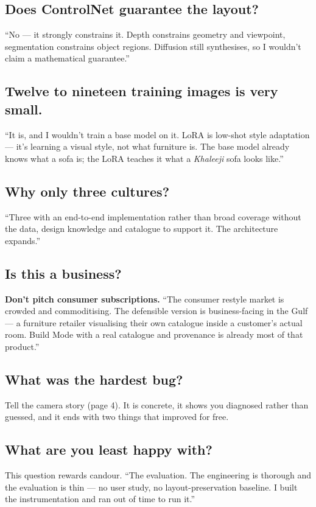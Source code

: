 \documentclass[10.5pt,a4paper]{article}
\begin{document}
\subsection*{Does ControlNet guarantee the layout?}
``No --- it strongly constrains it. Depth constrains geometry and viewpoint, segmentation constrains
object regions. Diffusion still synthesises, so I wouldn't claim a mathematical guarantee.''

\subsection*{Twelve to nineteen training images is very small.}
``It is, and I wouldn't train a base model on it. LoRA is low-shot style adaptation --- it's learning
a visual style, not what furniture is. The base model already knows what a sofa is; the LoRA teaches
it what a \emph{Khaleeji} sofa looks like.''

\subsection*{Why only three cultures?}
``Three with an end-to-end implementation rather than broad coverage without the data, design
knowledge and catalogue to support it. The architecture expands.''

\subsection*{Is this a business?}
\textbf{Don't pitch consumer subscriptions.} ``The consumer restyle market is crowded and
commoditising. The defensible version is business-facing in the Gulf --- a furniture retailer
visualising their own catalogue inside a customer's actual room. Build Mode with a real catalogue and
provenance is already most of that product.''

\subsection*{What was the hardest bug?}
Tell the camera story (page 4). It is concrete, it shows you diagnosed rather than guessed, and it
ends with two things that improved for free.

\subsection*{What are you least happy with?}
This question rewards candour. ``The evaluation. The engineering is thorough and the evaluation is
thin --- no user study, no layout-preservation baseline. I built the instrumentation and ran out of
time to run it.''
\end{document}
